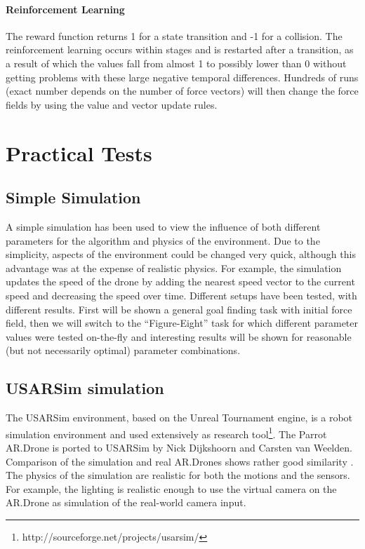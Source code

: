\documentclass[11pt]{article}
\begin{document}
\paragraph{Reinforcement Learning}
The reward function returns 1 for a state transition and -1 for a collision. The reinforcement learning occurs within stages and is restarted after a transition, as a result of which the values fall from almost 1 to possibly lower than 0 without getting problems with these large negative temporal differences. Hundreds of runs (exact number depends on the number of force vectors) will then change the force fields by using the value and vector update rules.



\section{Practical Tests}
\label{sec:tests}

\subsection{Simple Simulation}
A simple simulation has been used to view the influence of both different parameters for the algorithm and physics of the environment. Due to the simplicity, aspects of the environment could be changed very quick, although this advantage was at the expense of realistic physics. For example, the simulation updates the speed of the drone by adding the nearest speed vector to the current speed and decreasing the speed over time. Different setups have been tested, with different results. First will be shown a general goal finding task with initial force field, then we will switch to the ``Figure-Eight'' task for which different parameter values were tested on-the-fly and interesting results will be shown for reasonable (but not necessarily optimal) parameter combinations.

\subsection{USARSim simulation}
The USARSim environment, based on the Unreal Tournament engine, is a robot simulation environment and used extensively as research tool\footnote{http://sourceforge.net/projects/usarsim/}. The Parrot AR.Drone is ported to USARSim by Nick Dijkshoorn and Carsten van Weelden. Comparison of the simulation and real AR.Drones shows rather good similarity \cite{nick}. The physics of the simulation are realistic for both the motions and the sensors. For example, the lighting is realistic enough to use the virtual camera on the AR.Drone as simulation of the real-world camera input.
\end{document}

